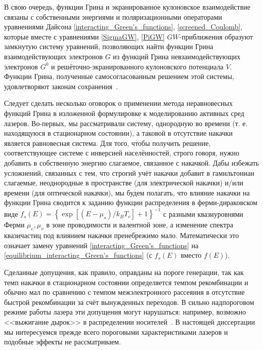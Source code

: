 В свою очередь, функции Грина и экранированное кулоновское взаимодействие связаны с собственными энергиями и поляризационными операторами уравнениями Дайсона \eqref{interacting_Green's_functions}, \eqref{screened_Coulomb}, которые вместе с уравнениями \eqref{SigmaGW}, \eqref{PiGW} $GW$-приближения образуют замкнутую систему уравнений, позволяющих найти функции Грина взаимодействующих электронов $G$ из функций Грина невзаимодействующих электронов $G^0$ и решёточно-экранированного кулоновского потенциала $V$. Функции Грина, полученные самосогласованным решением этой системы, удовлетворяют законам сохранения~\cite{NEGFhandbook}.

Следует сделать несколько оговорок о применении метода неравновесных функций Грина в изложенной формулировке к моделированию активных сред лазеров. Во-первых, мы рассматривали систему, однородную во времени (т. е. находящуюся в стационарном состоянии), а таковой в отсутствие накачки является равновесная система. Для того, чтобы получить решение, соответствующее системе с инверсией населённостей, строго говоря, нужно добавить в собственную энергию слагаемое, связанное с накачкой. Дабы избежать усложнений, связанных с тем, что строгий учёт накачки добавит в гамильтониан слагаемые, неоднородные в пространстве (для электрической накачки) и/или времени (для оптической накачки), мы будем полагать, что влияние накачки на функции Грина сводится к заданию функции распределения в ферми-дираковском виде $f_s(E) = \left\{ \exp\left[ (E - \mu_s)/k_B T_e \right] + 1 \right\}^{-1}$ с разными квазиуровнями Ферми $\mu_c, \mu_v$ в зоне проводимости и валентной зоне, а изменение спектра квазичастиц под влиянием накачки пренебрежимо мало. Математически это означает замену уравнений \eqref{interacting_Green's_functions} на \eqref{equilibrium_interacting_Green's_functions} (с $f_s(E)$ вместо $f(E)$).

Сделанные допущения, как правило, оправданы на пороге генерации, так как темп накачки в стационарном состоянии определяется темпом рекомбинации и обычно мал по сравнению с темпом межэлектронного рассеяния в отсутствие быстрой рекомбинации за счёт вынужденных переходов. В сильно надпороговом режиме работы лазера эти допущения могут нарушаться: например, возможно <<выжигание дырок>> в распределении носителей~\cite{spectral_hole_burning1, spectral_hole_burning2}. В настоящей диссертации мы интересуемся прежде всего пороговыми характеристиками лазеров и подобные эффекты не рассматриваем.

